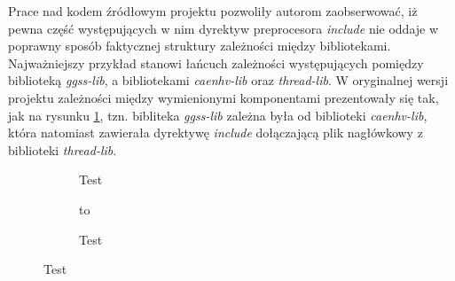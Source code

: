 Prace nad kodem źródłowym projektu pozwoliły autorom zaobserwować, iż pewna część występujących w nim dyrektyw preprocesora \emph{include} nie oddaje w poprawny sposób faktycznej struktury zależności między bibliotekami. Najważniejszy przykład stanowi łańcuch zależności występujących pomiędzy biblioteką \emph{ggss-lib}, a bibliotekami \emph{caenhv-lib} oraz \emph{thread-lib}. W oryginalnej wersji projektu zależności między wymienionymi komponentami prezentowały się tak, jak na rysunku \ref{fig:dependency_problem_old}, tzn. bibliteka \emph{ggss-lib} zależna była od biblioteki \emph{caenhv-lib}, która natomiast zawierała dyrektywę \emph{include} dołączającą plik nagłówkowy z biblioteki \emph{thread-lib}. 



\begin{figure}[H]
\centering
\begin{subfigure}[t]{0.40\textwidth}
\centering
\usebox{\mybox}
\caption{Test}
\label{fig:dependency_problem_old}
\end{subfigure}
\hfill
\begin{subfigure}[t]{0.55\textwidth}
\centering
\vbox to \ht{}
\caption{Test}
\label{fig:dependency_problem_solved}
\end{subfigure}

\caption{Test}
\end{figure}

